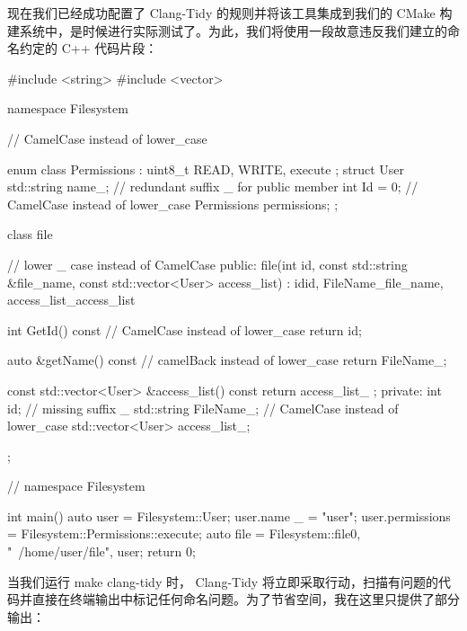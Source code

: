 现在我们已经成功配置了 Clang-Tidy 的规则并将该工具集成到我们的 CMake 构建系统中，是时候进行实际测试了。为此，我们将使用一段故意违反我们建立的命名约定的 C++ 代码片段：

\begin{cpp}
#include <string>
#include <vector>

namespace Filesystem { // CamelCase instead of lower_case

enum class Permissions : uint8_t { READ, WRITE, execute };
struct User {
    std::string name_; // redundant suffix _ for public member
    int Id = 0; // CamelCase instead of lower_case
    Permissions permissions;
};

class file { // lower _ case instead of CamelCase
public:
    file(int id, const std::string &file_name,
        const std::vector<User> access_list)
        : id{id}, FileName_{file_name}, access_list_{access_list} {}

    int GetId() const // CamelCase instead of lower_case
    {
        return id;
    }

    auto &getName() const // camelBack instead of lower_case
    {
        return FileName_;
    }

    const std::vector<User> &access_list() const { return access_list_ ; }
    private:
    int id; // missing suffix _
    std::string FileName_; // CamelCase instead of lower_case
    std::vector<User> access_list_;
};

} // namespace Filesystem

int main() {
    auto user = Filesystem::User{};
    user.name _ = "user";
    user.permissions = Filesystem::Permissions::execute;
    auto file = Filesystem::file{0, "~/home/user/file", {user}};
    return 0;
}
\end{cpp}

当我们运行 make clang-tidy 时， Clang-Tidy 将立即采取行动，扫描有问题的代码并直接在终端输出中标记任何命名问题。为了节省空间，我在这里只提供了部分输出：

